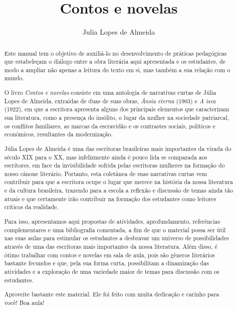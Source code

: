 \documentclass[12pt]{extarticle}
\begin{document}
\newcommand{\AutorLivro}{Julia Lopes de Almeida}
\newcommand{\TituloLivro}{Contos e novelas}
\newcommand{\Tema}{Ficção, mistério e fantasia}
\newcommand{\Genero}{Conto e novela}
\newcommand{\imagemCapa}{./images/PNLD0002-01.png}
\newcommand{\issnppub}{---}
\newcommand{\issnepub}{---}
\newcommand{\colaborador}{\textbf{Rodrigo Jorge Ribeiro Neves} é uma pessoa incrível e vai fazer um bom serviço.}


\title{\TituloLivro}
\author{\AutorLivro}
\def\authornotes{\colaborador}

\date{}
\maketitle



\begin{abstract}
Este manual tem o objetivo de auxiliá-lo no desenvolvimento de práticas
pedagógicas que estabeleçam o diálogo entre a obra literária aqui
apresentada e os estudantes, de modo a ampliar não apenas a leitura do
texto em si, mas também a sua relação com o mundo.

O livro \emph{Contos e novelas} consiste em uma antologia de narrativas
curtas de Júlia Lopes de Almeida, extraídas de duas de suas obras,
\emph{Ânsia eterna} (1903) e \emph{A isca} (1922), em que a escritora
apresenta alguns dos principais elementos que caracterizam sua
literatura, como a presença do insólito, o lugar da mulher na sociedade
patriarcal, os conflitos familiares, as marcas da escravidão e os
contrastes sociais, políticos e econômicos, resultantes da modernização.

Júlia Lopes de Almeida é uma das escritoras brasileiras mais importantes
da virada do século XIX para o XX, mas infelizmente ainda é pouco lida
se comparada aos escritores, em face da invisibilidade sofrida pelas
escritoras mulheres na formação do nosso cânone literário. Portanto,
esta coletânea de suas narrativas curtas vem contribuir para que a
escritora ocupe o lugar que merece na história da nossa literatura e da
cultura brasileira, trazendo para a escola a reflexão e discussão de
temas ainda tão atuais e que certamente irão contribuir na formação dos
estudantes como leitores críticos da realidade.

Para isso, apresentamos aqui propostas de atividades, aprofundamento,
referências complementares e uma bibliografia comentada, a fim de que o
material possa ser útil nas suas aulas para estimular os estudantes a
desbravar um universo de possibilidades através de uma das escritoras
mais importantes da nossa literatura. Além disso, é ótimo trabalhar com
contos e novelas em sala de aula, pois são gêneros literários bastante
fecundos e que, pela sua forma curta, possibilitam a dinamização das
atividades e a exploração de uma variedade maior de temas para discussão
com os estudantes.

Aproveite bastante este material. Ele foi feito com muita dedicação e
carinho para você! Boa aula!
\end{abstract}
\end{document}
